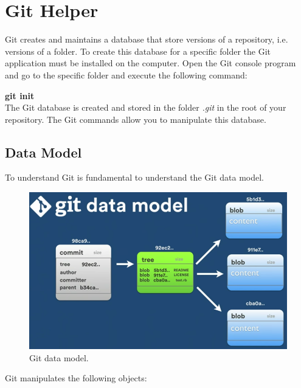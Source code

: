 \chapter{Git Helper}

Git creates and maintains a database that store versions of a repository, i.e. versions of a folder.
To create this database for a specific folder the Git application must be installed on the computer. Open the Git console program and go to the specific folder and execute the following command:
\\[0mm]
\par\textbf{git init}
\\[5mm]
The Git database is created and stored in the folder \emph{.git} in the root of your repository. The Git commands allow you to manipulate this database.

\section{Data Model}

To understand Git is fundamental to understand the Git data model.
\begin{figure}[h!]
  \centering
  \includegraphics[width=12cm]{../chapter/git/figures/git_data_model.png}
  \caption{Git data model.}\label{git_data_model}
\end{figure}

Git manipulates the following objects:


